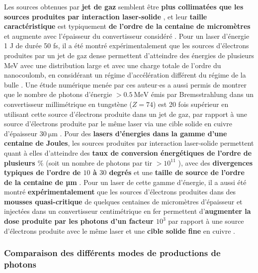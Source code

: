 \begin{refsection}
Les sources obtenues par \textbf{jet de gaz} semblent être \textbf{plus collimatées que les sources produites par interaction laser-solide} \parencite{edwards_2002, albert_2016}, et leur \textbf{taille caractéristique} est typiquement \textbf{de l'ordre de la centaine de micromètres} \parencite{ben-ismail_2011, glinec_2005} et augmente avec l'épaisseur du convertisseur considéré \parencite{ben-ismail_2011}.
Pour un laser d'énergie 1 J de durée 50 fs, il a été montré expérimentalement que les sources d'électrons produites par un jet de gaz dense permettent d'atteindre des énergies de plusieurs MeV avec une distribution large et avec une charge totale de l'ordre du nanocoulomb, en considérant un régime d'accélération différent du régime de la bulle \parencite{oishi_2011}. Une étude numérique menée par ces auteur$\cdot$es a aussi permis de montrer que le nombre de photons d'énergie $>0.5 ~ \si{\MeV}$ émis par Bremsstrahlung dans un convertisseur millimétrique en tungstène ($Z=74$) est 20 fois supérieur en utilisant cette source d'électrons produite dans un jet de gaz, par rapport à une source d'électrons produite par le même laser via une cible solide en cuivre d'épaisseur $30 ~ \si{\um}$ \parencite{oishi_2011}. 
Pour des \textbf{lasers d'énergies dans la gamme d'une centaine de Joules}, les sources produites par interaction laser-solide permettent quant à elles d'atteindre des \textbf{taux de conversion énergétiques de l'ordre de plusieurs $\%$} \parencite{henderson_2014, palaniyappan_2019} (soit un nombre de photons par tir $>10^{11}$ \parencite{palaniyappan_2019}), avec des \textbf{divergences typiques de l'ordre de $10$ à $30$ degrés} \parencite{henderson_2014, palaniyappan_2019} et une \textbf{taille de source de l'ordre de la centaine de µm} \parencite{palaniyappan_2019}. Pour un laser de cette gamme d'énergie, il a aussi été montré \textbf{expérimentalement} que les sources d'électrons produites dans des \textbf{mousses quasi-critique} de quelques centaines de micromètres d'épaisseur et injectées dans un convertisseur centimétrique en fer permettent d'\textbf{augmenter la dose produite par les photons d'un facteur $10^3$} par rapport à une source d'électrons produite avec le même laser et une \textbf{cible solide fine} en cuivre \parencite{rosmej_2019a}.

\subsubsection{Comparaison des différents modes de productions de photons}


\end{refsection}

